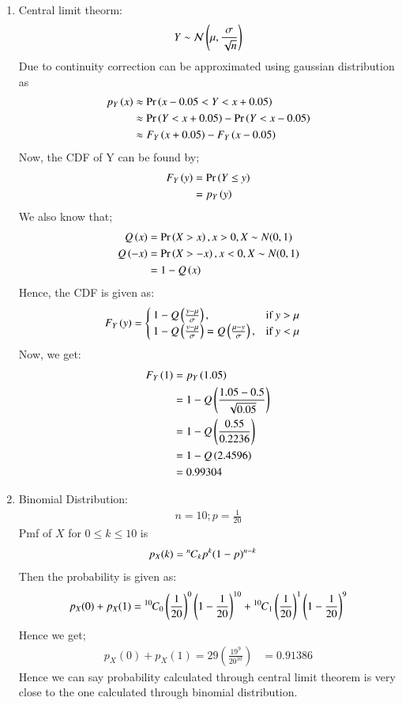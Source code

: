 \documentclass[journal,12pt,onecolumn]{IEEEtran}
\begin{document}
\\
\begin{enumerate}
\item Central limit theorm:
\begin{align}
Y &\sim \mathcal{N}\left(\mu,\frac{\sigma}{\sqrt{n}}\right)\\
\end{align}
Due to continuity correction  can be approximated using gaussian distribution as
\begin{align}
	p_Y\left(x\right)&\approx\Pr\left(x-0.05<Y<x+0.05\right)\\
	&\approx\Pr\left(Y<x+0.05\right)-\Pr\left(Y<x-0.05\right)	\\
	&\approx F_Y\left(x+0.05\right)-F_Y\left(x-0.05\right)
\end{align}
Now, the CDF of Y can be found by;
\begin{align}
F_{Y}\left(y\right) &= \Pr\left(Y \leq y\right)\\
&= p_{Y}\left(y\right)
\end{align}
We also know that;
\begin{align}
Q\left(x\right) &= \Pr\left(X > x\right), x > 0, X \sim N(0,1)\\
Q\left(-x\right) &= \Pr\left(X > -x\right), x < 0, X \sim N(0,1)\\
&= 1 - Q\left(x\right)
\end{align}
Hence, the CDF is given as:
\begin{align}
F_Y\left(y\right) &= \begin{cases}
                 1 - Q\left(\frac{y - \mu}{\sigma}\right),& \text{if $y > \mu$}\\
                 1 - Q\left(\frac{y - \mu}{\sigma}\right) = Q\left(\frac{\mu - y}{\sigma}\right),& \text{if $y < \mu$}
               \end{cases}
\end{align}
Now, we get:
\begin{align}
F_Y\left(1\right) &= p_{Y}\left(1.05\right)\\
&= 1 - Q\left(\frac{1.05 - 0.5}{\sqrt{0.05}}\right)\\
&= 1-Q\left(\frac{0.55}{0.2236}\right)\\
&= 1-Q\left(2.4596\right)\\
&= 0.99304
\end{align}
\item Binomial Distribution:
\begin{align}
n=10 ; p=\frac{1}{20}
\end{align}
Pmf of $X$ for $0 \leq k \leq 10$ is
\begin{align}
p_X(k)&={{}^{n}\mkern-1muC_{k}}p^k(1-p)^{n-k}
\end{align}
Then the probability is given as:
\begin{align}
p_X(0)+p_X(1)={{}^{10}\mkern-1muC_{0}}\left(\frac{1}{20}\right)^0\left(1-\frac{1}{20}\right)^{10}
+{{}^{10}\mkern-1muC_{1}}\left(\frac{1}{20}\right)^1\left(1-\frac{1}{20}\right)^{9}
\end{align}
Hence we get;
\begin{align}
p_X(0)+p_X(1)=29\left(\frac{19^9}{20^{10}}\right)
            &=0.91386
\end{align}
Hence we can say probability calculated through central limit theorem is very close to 
the one calculated through binomial distribution.
\end{enumerate}
\end{document}
